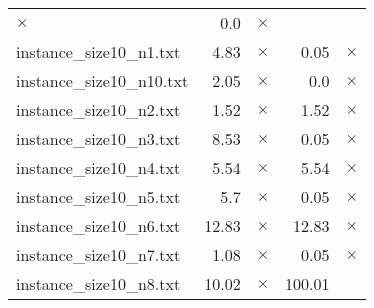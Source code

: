 \documentclass{article}
\begin{document}
\begin{center}
\begin{tabular}{lrrrr}
$\times$
 & 0.0 & 
$\times$
\\
instance\_size10\_n1.txt & 4.83 & 
$\times$
 & 0.05 & 
$\times$
\\
instance\_size10\_n10.txt & 2.05 & 
$\times$
 & 0.0 & 
$\times$
\\
instance\_size10\_n2.txt & 1.52 & 
$\times$
 & 1.52 & 
$\times$
\\
instance\_size10\_n3.txt & 8.53 & 
$\times$
 & 0.05 & 
$\times$
\\
instance\_size10\_n4.txt & 5.54 & 
$\times$
 & 5.54 & 
$\times$
\\
instance\_size10\_n5.txt & 5.7 & 
$\times$
 & 0.05 & 
$\times$
\\
instance\_size10\_n6.txt & 12.83 & 
$\times$
 & 12.83 & 
$\times$
\\
instance\_size10\_n7.txt & 1.08 & 
$\times$
 & 0.05 & 
$\times$
\\
instance\_size10\_n8.txt & 10.02 & 
$\times$
 & 100.01 & 
\\
\hline\end{tabular}
\end{center}
\end{document}
